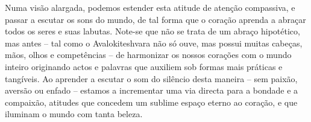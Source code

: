 Numa visão alargada, podemos estender esta atitude de atenção
compassiva, e passar a escutar os sons do mundo, de tal forma que o
coração aprenda a abraçar todos os seres e suas labutas. Note-se que não
se trata de um abraço hipotético, mas antes -- tal como o
Avalokiteshvara não só ouve, mas possui muitas cabeças, mãos, olhos e
competências -- de harmonizar os nossos corações com o mundo inteiro
originando actos e palavras que auxiliem sob formas mais práticas e
tangíveis. Ao aprender a escutar o som do silêncio desta maneira -- sem
paixão, aversão ou enfado -- estamos a incrementar uma via directa para
a bondade e a compaixão, atitudes que concedem um sublime espaço eterno
ao coração, e que iluminam o mundo com tanta beleza.

